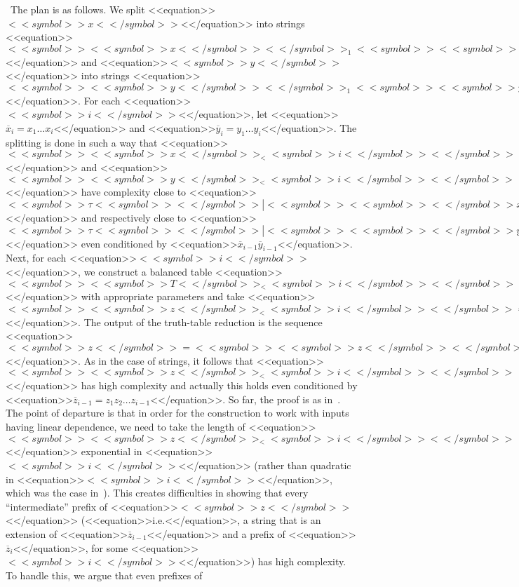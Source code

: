 \documentclass[proceedings]{stacs}
\newcommand{\ie}{<<equation>>$\mbox{i.e.}$<</equation>>}
\newcommand{\barx}{\overline{x}}
\newcommand{\bary}{\overline{y}}
\newcommand{\barz}{\overline{z}}
\begin{document}
\proof~The plan is as follows. We split <<equation>>$<<symbol>>x<</symbol>>$<</equation>> into strings <<equation>>$<<symbol>><<symbol>>x<</symbol>><</symbol>>_1 <<symbol>><<symbol>>x<</symbol>><</symbol>>_2 \ldots <<symbol>><<symbol>>x<</symbol>>_<<symbol>>i<</symbol>><</symbol>> \ldots$<</equation>> and <<equation>>$<<symbol>>y<</symbol>>$<</equation>> into strings <<equation>>$<<symbol>><<symbol>>y<</symbol>><</symbol>>_1 <<symbol>><<symbol>>y<</symbol>><</symbol>>_2 \ldots <<symbol>><<symbol>>y<</symbol>>_<<symbol>>i<</symbol>><</symbol>> \ldots$<</equation>>. For each <<equation>>$<<symbol>>i<</symbol>>$<</equation>>, let <<equation>>$\barx_{i} = x_1 \ldots x_i$<</equation>> and <<equation>>$\bary_{i} = y_1 \ldots y_i$<</equation>>. The splitting is done in such a way that <<equation>>$<<symbol>><<symbol>>x<</symbol>>_<<symbol>>i<</symbol>><</symbol>>$<</equation>> and <<equation>>$<<symbol>><<symbol>>y<</symbol>>_<<symbol>>i<</symbol>><</symbol>>$<</equation>> have complexity close to <<equation>>$<<symbol>>\tau <<symbol>><</symbol>>|<<symbol>><<symbol>><</symbol>>x<</symbol>>_<<symbol>>i<<symbol>><</symbol>><</symbol>>|<</symbol>>$<</equation>> and respectively close to <<equation>>$<<symbol>>\tau <<symbol>><</symbol>>|<<symbol>><<symbol>><</symbol>>y<</symbol>>_<<symbol>>i<<symbol>><</symbol>><</symbol>>|<</symbol>>$<</equation>> even conditioned by <<equation>>$\barx_{i-1} \bary_{i-1}$<</equation>>. Next, for each <<equation>>$<<symbol>>i<</symbol>>$<</equation>>, we construct a balanced table <<equation>>$<<symbol>><<symbol>>T<</symbol>>_<<symbol>>i<</symbol>><</symbol>>$<</equation>> with appropriate parameters and take <<equation>>$<<symbol>><<symbol>>z<</symbol>>_<<symbol>>i<</symbol>><</symbol>> = <<symbol>>T<</symbol>>(<<symbol>><<symbol>>x<</symbol>>_<<symbol>>i<</symbol>><</symbol>>, <<symbol>><<symbol>>y<</symbol>>_<<symbol>>i<</symbol>><</symbol>>)$<</equation>>. The output of the truth-table reduction is the sequence <<equation>>$<<symbol>>z<</symbol>> = <<symbol>><<symbol>>z<</symbol>><</symbol>>_1 <<symbol>><<symbol>>z<</symbol>><</symbol>>_2 \ldots <<symbol>><<symbol>>z<</symbol>>_<<symbol>>i<</symbol>><</symbol>> \ldots$<</equation>>. As in the case of strings, it follows that <<equation>>$<<symbol>><<symbol>>z<</symbol>>_<<symbol>>i<</symbol>><</symbol>>$<</equation>> has high complexity and actually this holds even conditioned by <<equation>>$\barz_{i-1} = z_1 z_2 \ldots z_{i-1}$<</equation>>. So far, the proof is as in~\cite{zim:c:csr}. The point of departure is that in order for the construction to work with inputs having linear dependence, we need to take the length of <<equation>>$<<symbol>><<symbol>>z<</symbol>>_<<symbol>>i<</symbol>><</symbol>>$<</equation>> exponential in <<equation>>$<<symbol>>i<</symbol>>$<</equation>> (rather than quadratic in <<equation>>$<<symbol>>i<</symbol>>$<</equation>>, which was the case in~\cite{zim:c:csr}). This creates difficulties in showing that every ``intermediate'' prefix of <<equation>>$<<symbol>>z<</symbol>>$<</equation>> (\ie, a string that is an extension of <<equation>>$\barz_{i-1}$<</equation>> and a prefix of <<equation>>$\barz_i$<</equation>>, for some <<equation>>$<<symbol>>i<</symbol>>$<</equation>>) has high complexity. To handle this, we argue that even prefixes of 
\end{document}
